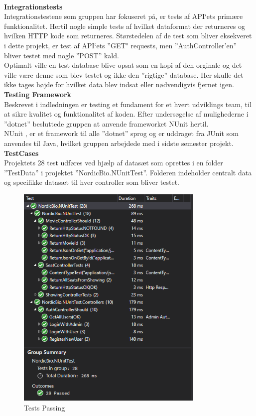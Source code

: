 \\
\textbf{Integrationstests}\\
Integrationstestene som gruppen har fokuseret på, er tests af API‘ets primære funktionalitet. 
Hertil nogle simple tests af hvilket dataformat der returneres og hvilken HTTP kode som returneres. 
Størstedelen af de test som bliver eksekveret i dette projekt, er test af API‘ets ”GET" requests, men 
”AuthController’en” bliver testet med nogle ”POST” kald. \\

Optimalt ville en test database blive opsat som en kopi af den orginale og det ville være denne som 
blev testet og ikke den ”rigtige” database. Her skulle det ikke tages højde for hvilket data blev indsat 
eller nødvendigvis fjernet igen.\\ 

\textbf{Testing Framework}\\
Beskrevet i indledningen er testing et fundament for et hvert udviklings team, til at sikre 
kvalitet og funktionalitet af koden. Efter undersøgelse af mulighederne i ”dotnet” besluttede 
gruppen at anvende frameworket NUnit hertil. \\

NUnit \cite{NUnit}, er et framework til alle ”dotnet” sprog og er uddraget fra JUnit som anvendes til Java, 
hvilket gruppen arbejdede med i sidste semester projekt.\\

\textbf{TestCases}\\
Projektets 28 test udføres ved hjælp af datasæt som oprettes i en folder ”TestData” i projektet 
”NordicBio.NUnitTest”. Folderen indeholder centralt data og specifikke datasæt til hver controller 
som bliver testet. \\

\begin{figure}[H]
    \centering
    \includegraphics[width=0.8\textwidth]{figures/testpassing.PNG}
    \caption{Tests Passing}
    \label{fig:testpassing}
\end{figure}

